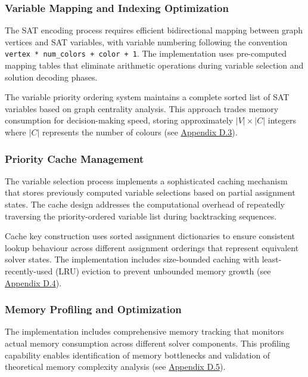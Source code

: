 \subsubsection{Variable Mapping and Indexing Optimization}

The SAT encoding process requires efficient bidirectional mapping between graph vertices and SAT variables, with variable numbering following the convention \texttt{vertex * num\_colors + color + 1}. The implementation uses pre-computed mapping tables that eliminate arithmetic operations during variable selection and solution decoding phases.

The variable priority ordering system maintains a complete sorted list of SAT variables based on graph centrality analysis. This approach trades memory consumption for decision-making speed, storing approximately $|V| \times |C|$ integers where $|C|$ represents the number of colours (see \hyperref[appendix:variable-mapping]{Appendix D.3}).

\subsubsection{Priority Cache Management}

The variable selection process implements a sophisticated caching mechanism that stores previously computed variable selections based on partial assignment states. The cache design addresses the computational overhead of repeatedly traversing the priority-ordered variable list during backtracking sequences.

Cache key construction uses sorted assignment dictionaries to ensure consistent lookup behaviour across different assignment orderings that represent equivalent solver states. The implementation includes size-bounded caching with least-recently-used (LRU) eviction to prevent unbounded memory growth (see \hyperref[appendix:priority-cache]{Appendix D.4}).

\subsubsection{Memory Profiling and Optimization}

The implementation includes comprehensive memory tracking that monitors actual memory consumption across different solver components. This profiling capability enables identification of memory bottlenecks and validation of theoretical memory complexity analysis (see \hyperref[appendix:memory-profiling]{Appendix D.5}).

